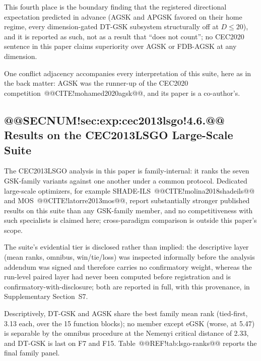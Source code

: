 \documentclass[10pt,a4paper]{article}
\newcommand{\dtgsk}{DT-GSK}
\newcommand{\agsk}{AGSK}
\newcommand{\apgsk}{APGSK}
\newcommand{\fdbagsk}{FDB-AGSK}
\newcommand{\egsk}{eGSK}
\begin{document}
This fourth place is the boundary finding that the registered directional
expectation predicted in advance (\agsk{} and \apgsk{} favored on
their home regime, every dimension-gated \dtgsk{} subsystem structurally
off at $D \leq 20$), and it is reported as such, not as a result that
``does not count''; no CEC2020 sentence in this paper claims superiority
over \agsk{} or \fdbagsk{} at any dimension.

One conflict adjacency accompanies every interpretation of this suite,
here as in the back matter: \agsk{} was the runner-up of the CEC2020
competition~@@CITE!mohamed2020agsk@@, and its paper is a co-author's.



\subsection{@@SECNUM!sec:exp:cec2013lsgo!4.6.@@ Results on the CEC2013LSGO Large-Scale Suite}\label{sec:exp:cec2013lsgo}


The CEC2013LSGO analysis in this paper is family-internal: it ranks the
seven GSK-family variants against one another under a common protocol.
Dedicated large-scale optimizers, for example
SHADE-ILS~@@CITE!molina2018shadeils@@ and MOS~@@CITE!latorre2013mos@@,
report substantially stronger published results on this suite than any
GSK-family member, and no competitiveness with such specialists is
claimed here; cross-paradigm comparison is outside this paper's scope.

The suite's evidential tier is disclosed rather than implied: the
descriptive layer (mean ranks, omnibus, win/tie/loss) was inspected
informally before the analysis addendum was signed and therefore carries
no confirmatory weight, whereas the run-level paired layer had never
been computed before registration and is confirmatory-with-disclosure;
both are reported in full, with this provenance, in Supplementary
Section~S7.


Descriptively, \dtgsk{} and \agsk{} share the best family mean rank
(tied-first, 3.13 each, over the 15 function blocks); no member except
\egsk{} (worse, at 5.47) is separable by the omnibus procedure at the
Nemenyi critical distance of 2.33, and \dtgsk{} is last on F7 and F15.
Table~@@REF!tab:lsgo-ranks@@ reports the final family panel.
\end{document}
